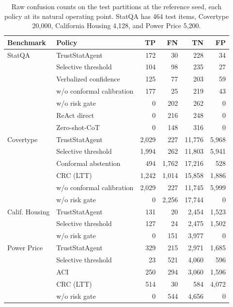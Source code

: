 \documentclass[preprint,12pt,authoryear]{elsarticle}
\begin{document}
\begin{table}[!tb]
    \centering
    \caption{Raw confusion counts on the test partitions at the reference seed, each policy at its natural operating point. StatQA has 464 test items, Covertype 20{,}000, California Housing 4{,}128, and Power Price 5{,}200.}
    \label{tab:raw_counts}
    \footnotesize
    \setlength{\tabcolsep}{7pt}
    \renewcommand{\arraystretch}{1.12}
    \begin{tabular}{@{}llrrrr@{}}
        \toprule
        \textbf{Benchmark} & \textbf{Policy} & \textbf{TP} & \textbf{FN} & \textbf{TN} & \textbf{FP} \\
        \midrule
        StatQA & TrustStatAgent & 172 & 30 & 228 & 34 \\
               & Selective threshold & 104 & 98 & 235 & 27 \\
               & Verbalized confidence & 125 & 77 & 203 & 59 \\
               & w/o conformal calibration & 177 & 25 & 219 & 43 \\
               & w/o risk gate & 0 & 202 & 262 & 0 \\
               & ReAct direct & 0 & 216 & 248 & 0 \\
               & Zero-shot-CoT & 0 & 148 & 316 & 0 \\
        \midrule
        Covertype & TrustStatAgent & 2{,}029 & 227 & 11{,}776 & 5{,}968 \\
              & Selective threshold & 1{,}994 & 262 & 11{,}803 & 5{,}941 \\
              & Conformal abstention & 494 & 1{,}762 & 17{,}216 & 528 \\
              & CRC (LTT) & 1{,}242 & 1{,}014 & 15{,}858 & 1{,}886 \\
              & w/o conformal calibration & 2{,}029 & 227 & 11{,}745 & 5{,}999 \\
              & w/o risk gate & 0 & 2{,}256 & 17{,}744 & 0 \\
        \midrule
        Calif. Housing & TrustStatAgent & 131 & 20 & 2{,}454 & 1{,}523 \\
              & Selective threshold & 127 & 24 & 2{,}475 & 1{,}502 \\
              & w/o risk gate & 0 & 151 & 3{,}977 & 0 \\
        \midrule
        Power Price & TrustStatAgent & 329 & 215 & 2{,}971 & 1{,}685 \\
              & Selective threshold & 23 & 521 & 4{,}060 & 596 \\
              & ACI & 250 & 294 & 3{,}060 & 1{,}596 \\
              & CRC (LTT) & 514 & 30 & 584 & 4{,}072 \\
              & w/o risk gate & 0 & 544 & 4{,}656 & 0 \\
        \bottomrule
    \end{tabular}
\end{table}
\end{document}

